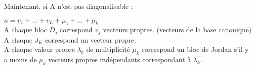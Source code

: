 Maintenant, si A n'est pas diagonalisable :

$n=v_1+...+v_L+\mu_1+...+\mu_k$\\
A chaque bloc $D_j$ correspond $v_j$ vecteurs propres. (vecteurs de la base canonique)\\
A chaque $J_K$ correspond un vecteur propre.\\
A chaque valeur propre $\lambda_k$ de multiplicité $\mu_k$ correspond un bloc de Jordan s'il y a moins de $\mu_k$ vecteurs propres indépendants correspondant à $\lambda_k$.

